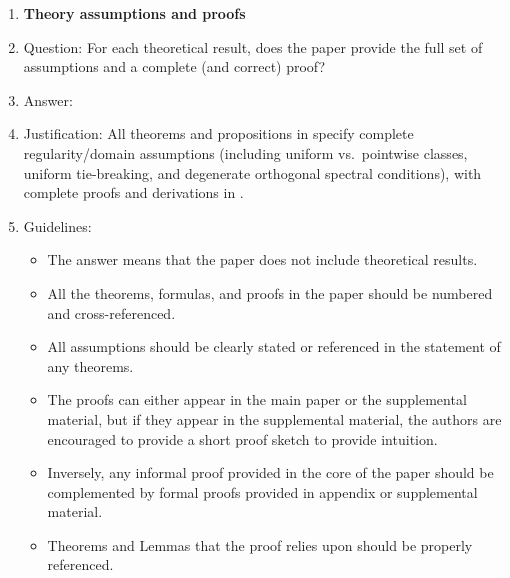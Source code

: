 \documentclass{article}
\theoremstyle{plain}
\theoremstyle{definition}
\theoremstyle{remark}
\begin{document}
\begin{enumerate}
\item {\bf Theory assumptions and proofs}
    \item[] Question: For each theoretical result, does the paper provide the full set of assumptions and a complete (and correct) proof?
    \item[] Answer: \answerYes{}
    \item[] Justification: All theorems and propositions in  specify complete regularity/domain assumptions (including uniform vs.\ pointwise classes, uniform tie-breaking, and degenerate orthogonal spectral conditions), with complete proofs and derivations in .
    \item[] Guidelines:
    \begin{itemize}
        \item The answer \answerNA{} means that the paper does not include theoretical results.
        \item All the theorems, formulas, and proofs in the paper should be numbered and cross-referenced.
        \item All assumptions should be clearly stated or referenced in the statement of any theorems.
        \item The proofs can either appear in the main paper or the supplemental material, but if they appear in the supplemental material, the authors are encouraged to provide a short proof sketch to provide intuition.
        \item Inversely, any informal proof provided in the core of the paper should be complemented by formal proofs provided in appendix or supplemental material.
        \item Theorems and Lemmas that the proof relies upon should be properly referenced.
    \end{itemize}


\end{enumerate}
\end{document}
